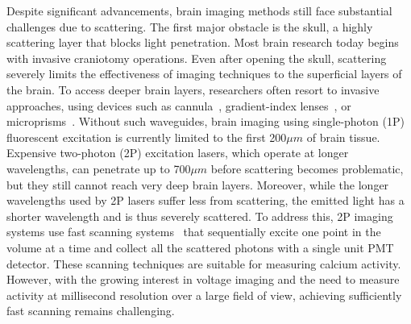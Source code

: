 Despite significant advancements, brain imaging methods still face substantial challenges due to scattering. The first major obstacle is the skull, a highly scattering layer that blocks light penetration. Most brain research today begins with invasive craniotomy operations. Even after opening the skull, scattering severely limits the effectiveness of imaging techniques to the superficial layers of the brain. To access deeper brain layers, researchers often resort to invasive approaches, using devices such as cannula~\cite{Mohammed2016Integrative}, gradient-index lenses~\cite{Jung2004InVivo,jennings2019interacting}, or microprisms~\cite{Andermann2013Chronic}. Without such waveguides, brain imaging using single-photon (1P) fluorescent excitation is currently limited to the first 200$\mu m$ of brain tissue. Expensive two-photon (2P) excitation lasers, which operate at longer wavelengths, can penetrate up to 700$\mu m$ before scattering becomes problematic, but they still cannot reach very deep brain layers. Moreover, while the longer wavelengths used by 2P lasers suffer less from scattering, the emitted light has a shorter wavelength and is thus severely scattered. To address this, 2P imaging systems use fast scanning systems~\cite{wu2020kilohertz} that sequentially excite one point in the volume at a time and collect all the scattered photons with a single unit PMT detector. These scanning techniques are suitable for measuring calcium activity. However, with the growing interest in voltage imaging and the need to measure  activity at millisecond resolution over a large field of view, achieving sufficiently fast scanning remains challenging.


